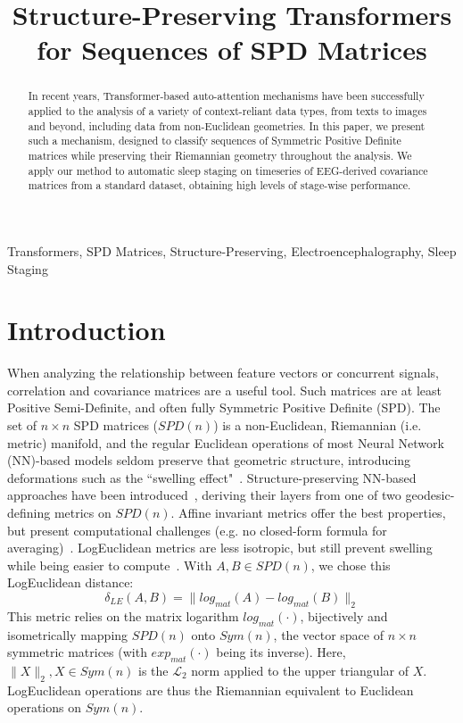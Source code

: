 \documentclass{article}
\title{Structure-Preserving Transformers for Sequences of SPD Matrices}
\begin{document}
\maketitle

\begin{abstract}
In recent years, Transformer-based auto-attention mechanisms have been successfully applied to the analysis of a variety of context-reliant data types, from texts to images and beyond, including data from non-Euclidean geometries. In this paper, we present such a mechanism, designed to classify sequences of Symmetric Positive Definite matrices while preserving their Riemannian geometry throughout the analysis. We apply our method to automatic sleep staging on timeseries of EEG-derived covariance matrices from a standard dataset, obtaining high levels of stage-wise performance.
\end{abstract}

\begin{keywords}
Transformers, SPD Matrices, Structure-Preserving, Electroencephalography, Sleep Staging
\end{keywords}

\section{Introduction}
\label{sec:intro}

When analyzing the relationship between feature vectors or concurrent signals, correlation and covariance matrices are a useful tool. Such matrices are at least Positive Semi-Definite, and often fully Symmetric Positive Definite (SPD).
The set of $n \times n$ SPD matrices ($SPD(n)$) is a non-Euclidean, Riemannian (i.e. metric) manifold, and the regular Euclidean operations of most Neural Network (NN)-based models seldom preserve that geometric structure, introducing deformations such as the ``swelling effect"~\cite{LogEuclidean}.
Structure-preserving NN-based approaches have been introduced~\cite{huang2017spdnet,manifoldnet}, deriving their layers from one of two geodesic-defining metrics on $SPD(n)$. Affine invariant metrics offer the best properties, but present computational challenges (e.g. no closed-form formula for averaging)~\cite{affine_invariant}. 
LogEuclidean metrics are less isotropic, but still prevent swelling while being easier to compute~\cite{LogEuclidean}. With $A, B \in SPD(n)$, we chose this LogEuclidean distance:
\begin{equation}
\label{eq:LE}
\delta_{LE}(A, B) = \lVert log_{mat}(A) - log_{mat}(B) \rVert_2
\end{equation}
This metric relies on the matrix logarithm $log_{mat}(\cdot)$, bijectively and isometrically mapping $SPD(n)$ onto $Sym(n)$, the vector space of $n \times n$ symmetric matrices (with $exp_{mat}(\cdot)$ being its inverse).
Here, $\lVert X \rVert_2, X \in Sym(n)$ is the $\mathcal{L}_2$ norm applied to the upper triangular of $X$.
LogEuclidean operations are thus the Riemannian equivalent to Euclidean operations on $Sym(n)$.
\end{document}
